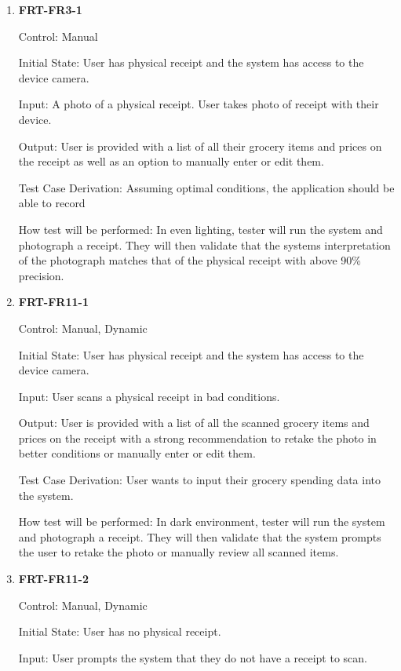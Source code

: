 \documentclass[12pt, titlepage]{article}
\begin{document}
\begin{enumerate}

\item{\textbf{FRT-FR3-1}}

Control: Manual
          
Initial State: User has physical receipt and the system has access to the device camera.
          
Input: A photo of a physical receipt. User takes photo of receipt with their device.
          
Output: User is provided with a list of all their grocery items and prices on the receipt as well as an option to manually enter or edit them.

Test Case Derivation: Assuming optimal conditions, the application should be able to record 
          
How test will be performed: In even lighting, tester will run the system and photograph a receipt. They will then validate that the systems interpretation of the photograph matches that of the physical receipt with above 90\% precision.

\item{\textbf{FRT-FR11-1}}

Control: Manual, Dynamic
          
Initial State: User has physical receipt and the system has access to the device camera.

Input: User scans a physical receipt in bad conditions.
          
Output: User is provided with a list of all the scanned grocery items and prices on the receipt with a strong recommendation to retake the photo in better conditions or manually enter or edit them.

Test Case Derivation: User wants to input their grocery spending data into the system.
          
How test will be performed: In dark environment, tester will run the system and photograph a receipt. They will then validate that the system prompts the user to retake the photo or manually review all scanned items.

\item{\textbf{FRT-FR11-2}}

Control: Manual, Dynamic
          
Initial State: User has no physical receipt.

Input: User prompts the system that they do not have a receipt to scan.
          

\end{enumerate}
\end{document}
